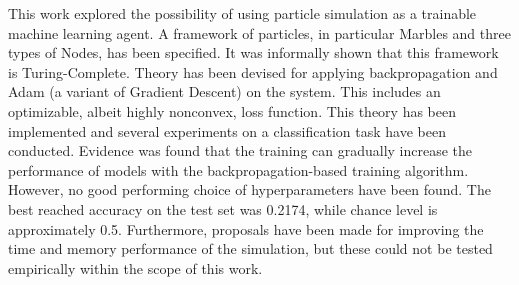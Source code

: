This work explored the possibility of using particle simulation as a trainable machine learning agent.
A framework of particles, in particular Marbles and three types of Nodes, has been specified.
It was informally shown that this framework is Turing-Complete.
Theory has been devised for applying backpropagation and Adam (a variant of Gradient Descent) on the system.
This includes an optimizable, albeit highly nonconvex, loss function.
This theory has been implemented and several experiments on a classification task have been conducted.
Evidence was found that the training can gradually increase the performance of models with the backpropagation-based training algorithm.
However, no good performing choice of hyperparameters have been found.
The best reached accuracy on the test set was 0.2174, while chance level is approximately 0.5.
Furthermore, proposals have been made for improving the time and memory performance of the simulation,
but these could not be tested empirically within the scope of this work.